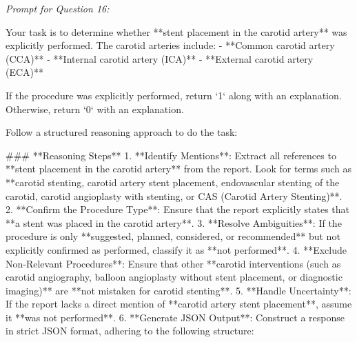 \textit{\normalsize Prompt for Question  16:}
\begin{mdframed}[]
\normalsize

Your task is to determine whether **stent placement in the carotid artery** was explicitly performed. The carotid arteries include:  
- **Common carotid artery (CCA)**  
- **Internal carotid artery (ICA)**  
- **External carotid artery (ECA)**  

If the procedure was explicitly performed, return `1` along with an explanation. Otherwise, return `0` with an explanation.

Follow a structured reasoning approach to do the task:

### **Reasoning Steps**  
1. **Identify Mentions**: Extract all references to **stent placement in the carotid artery** from the report. Look for terms such as **carotid stenting, carotid artery stent placement, endovascular stenting of the carotid, carotid angioplasty with stenting, or CAS (Carotid Artery Stenting)**.  
2. **Confirm the Procedure Type**: Ensure that the report explicitly states that **a stent was placed in the carotid artery**.  
3. **Resolve Ambiguities**: If the procedure is only **suggested, planned, considered, or recommended** but not explicitly confirmed as performed, classify it as **not performed**.  
4. **Exclude Non-Relevant Procedures**: Ensure that other **carotid interventions (such as carotid angiography, balloon angioplasty without stent placement, or diagnostic imaging)** are **not mistaken for carotid stenting**.  
5. **Handle Uncertainty**: If the report lacks a direct mention of **carotid artery stent placement**, assume it **was not performed**.  
6. **Generate JSON Output**: Construct a response in strict JSON format, adhering to the following structure:  

\end{mdframed}

